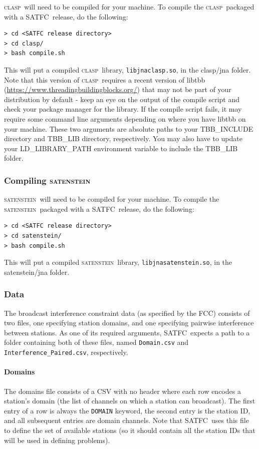 \documentclass[
10pt, %
letterpaper, %
oneside, %
headinclude,footinclude, %
BCOR5mm, %
needspace, %
]{scrartcl}
\newcommand{\SATFC}{\textsc{SATFC}~}
\newcommand{\clasp}{\textsc{clasp}~}
\newcommand{\satenstein}{\textsc{satenstein}~}
\begin{document}
\clasp will need to be compiled for your machine. To compile the \clasp packaged with a \SATFC release, do the following:
\begin{lstlisting}[style=Bash]
> cd <SATFC release directory>
> cd clasp/
> bash compile.sh
\end{lstlisting}
This will put a compiled \clasp library, \texttt{libjnaclasp.so}, in the clasp/jna folder.
Note that this version of \clasp requires a recent version of libtbb (\url{https://www.threadingbuildingblocks.org/}) that may not be part of your distribution by default - keep an eye on the output of the compile script and check your package manager for the library. If the compile script fails, it may require some command line arguments depending on where you have libtbb on your machine. These two arguments are absolute paths to your TBB\_INCLUDE directory and TBB\_LIB directory, respectively. You may also have to update your LD\_LIBRARY\_PATH environment variable to include the TBB\_LIB folder.

\subsubsection{Compiling \satenstein}

\satenstein will need to be compiled for your machine. To compile the \satenstein packaged with a \SATFC release, do the following:
\begin{lstlisting}[style=Bash]
> cd <SATFC release directory>
> cd satenstein/
> bash compile.sh
\end{lstlisting}
This will put a compiled \satenstein library, \texttt{libjnasatenstein.so}, in the satenstein/jna folder.

\subsubsection{Data}\label{sec:data}

The broadcast interference constraint data (as specified by the FCC) consists of two files, one specifying station domains, and one specifying pairwise interference between stations. As one of its required arguments, \SATFC expects a path to a folder containing both of these files, named \texttt{Domain.csv} and \texttt{Interference\_Paired.csv}, respectively.

\paragraph{Domains} The domains file consists of a CSV with no header where each row encodes a station's domain (the list of channels on which a station can broadcast). The first entry of a row is always the \texttt{DOMAIN} keyword, the second entry is the station ID, and all subsequent entries are domain channels. Note that \SATFC uses this file to define the set of available stations (so it should contain all the station IDs that will be used in defining problems).
\end{document}
